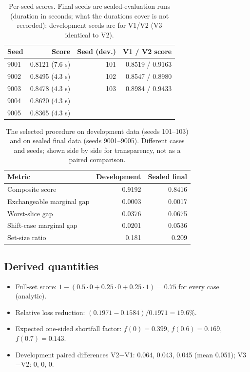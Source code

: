 \documentclass{article}
\begin{document}
\begin{table}[h]
\centering
\caption{Per-seed scores. Final seeds are sealed-evaluation runs (duration in seconds; what the durations cover is not recorded); development seeds are for V1/V2 (V3 identical to V2).}
\label{tab:seeds}
\begin{tabular}{lrrr}
\toprule
Seed & Score & Seed (dev.) & V1 / V2 score \\
\midrule
9001 & 0.8121 (7.6 s) & 101 & 0.8519 / 0.9163 \\
9002 & 0.8495 (4.3 s) & 102 & 0.8547 / 0.8980 \\
9003 & 0.8478 (4.3 s) & 103 & 0.8984 / 0.9433 \\
9004 & 0.8620 (4.3 s) & & \\
9005 & 0.8365 (4.3 s) & & \\
\bottomrule
\end{tabular}
\end{table}

\begin{table}[h]
\centering
\caption{The selected procedure on development data (seeds 101--103) and on sealed final data (seeds 9001--9005). Different cases and seeds; shown side by side for transparency, not as a paired comparison.}
\label{tab:devfinal}
\begin{tabular}{lrr}
\toprule
Metric & Development & Sealed final \\
\midrule
Composite score & 0.9192 & 0.8416 \\
Exchangeable marginal gap & 0.0003 & 0.0017 \\
Worst-slice gap & 0.0376 & 0.0675 \\
Shift-case marginal gap & 0.0201 & 0.0536 \\
Set-size ratio & 0.181 & 0.209 \\
\bottomrule
\end{tabular}
\end{table}

\subsection{Derived quantities}
\begin{itemize}
\item Full-set score: $1-(0.5\cdot0+0.25\cdot0+0.25\cdot1)=0.75$ for every case (analytic).
\item Relative loss reduction: $(0.1971-0.1584)/0.1971=19.6\%$. %
\item Expected one-sided shortfall factor: $f(0)=0.399$, $f(0.6)=0.169$, $f(0.7)=0.143$. %
\item Development paired differences V2$-$V1: 0.064, 0.043, 0.045 (mean 0.051); V3$-$V2: 0, 0, 0.
\end{itemize}
\end{document}
